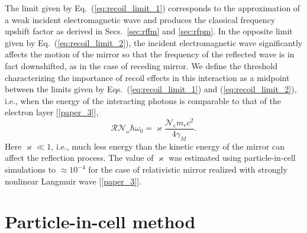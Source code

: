\documentclass[10pt, a4paper, twoside, openright]{report}
\begin{document}
The limit given by Eq.~(\ref{eq:recoil_limit_1}) corresponds to the approximation of a weak incident electromagnetic wave and produces the classical frequency upshift factor as derived in Secs.~\ref{sec:rffm} and \ref{sec:rfpm}. In the opposite limit given by Eq.~(\ref{eq:recoil_limit_2}), the incident electromagnetic wave significantly affects the motion of the mirror so that the frequency of the reflected wave is in fact downshifted, as in the case of receding mirror. We define the threshold characterizing the importance of recoil effects in this interaction as a midpoint between the limits given by Eqs.~(\ref{eq:recoil_limit_1}) and (\ref{eq:recoil_limit_2}), i.e., when the energy of the interacting photons is comparable to that of the electron layer [\ref{paper_3}],
\begin{equation}\label{eq:recoil_threshold}
	\mathcal{R} \mathcal{N}_{\omega} \hbar  \omega_0 = \varkappa \frac{\mathcal{N}_e m_e c^2}{4 \gamma_M}.
\end{equation}
Here $ \varkappa \ll 1 $, i.e., much less energy than the kinetic energy of the mirror can affect the reflection process. The value of $ \varkappa $ was estimated using particle-in-cell simulations to $ \approx 10^{-4} $ for the case of relativistic mirror realized with strongly nonlinear Langmuir wave [\ref{paper_3}].




\section{Particle-in-cell method}
%


\end{document}
